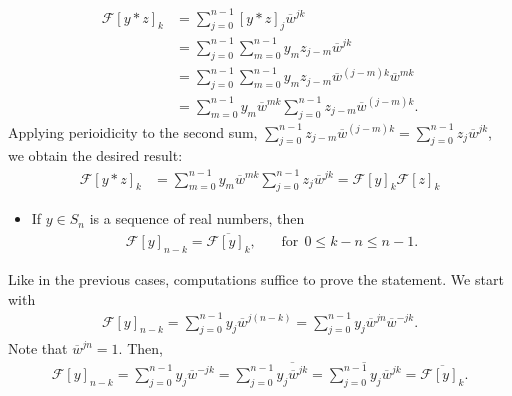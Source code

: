\begin{questions}
\begin{solution}
\begin{align*}
\mathcal{F}[y*z]_k&=\sum_{j=0}^{n-1}[y*z]_j\overline{w}^{jk}\\
&=\sum_{j=0}^{n-1}\sum_{m=0}^{n-1}y_mz_{j-m}\overline{w}^{jk}\\
&=\sum_{j=0}^{n-1}\sum_{m=0}^{n-1}y_mz_{j-m}\overline{w}^{(j-m)k}\overline{w}^{mk}\\
&=\sum_{m=0}^{n-1}y_m\overline{w}^{mk}\sum_{j=0}^{n-1}z_{j-m}\overline{w}^{(j-m)k}.
\end{align*}
Applying perioidicity to the second sum, $\sum_{j=0}^{n-1}z_{j-m}\overline{w}^{(j-m)k}=\sum_{j=0}^{n-1}z_j\overline{w}^{jk}$, we obtain the desired result:
\begin{align*}
\mathcal{F}[y*z]_k&=\sum_{m=0}^{n-1}y_m\overline{w}^{mk}\sum_{j=0}^{n-1}z_{j}\overline{w}^{jk}=\mathcal{F}[y]_k\mathcal{F}[z]_k
\end{align*}
\end{solution}
\begin{itemize}
\item If $y\in S_n$ is a sequence of real numbers, then
\begin{align*}
\mathcal{F}[y]_{n-k}=\overline{\mathcal{F}[y]_{k}},~~~~~~~~\text{for}~~ 0\leq k-n\leq n-1.
\end{align*}
\end{itemize}
\begin{solution}
Like in the previous cases, computations suffice to prove the statement. We start with
\begin{align*}
\mathcal{F}[y]_{n-k}=\sum_{j=0}^{n-1}y_j\overline{w}^{j(n-k)}=\sum_{j=0}^{n-1}y_j\overline{w}^{jn}\overline{w}^{-jk}.
\end{align*}
Note that $\overline{w}^{jn}=1$. Then,
\begin{align*}
\mathcal{F}[y]_{n-k}=\sum_{j=0}^{n-1}y_j\overline{w}^{-jk}=\sum_{j=0}^{n-1}\overline{y_j\overline{w}^{jk}}=\overline{\sum_{j=0}^{n-1}y_j\overline{w}^{jk}}=\overline{\mathcal{F}[y]_k}.
\end{align*}
\end{solution}

\end{questions}
